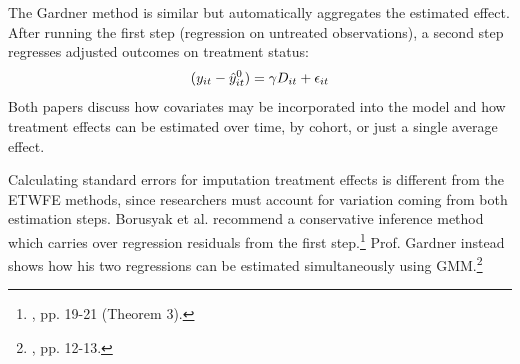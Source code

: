 \documentclass[12pt]{article}
\begin{document}
The Gardner method is similar but automatically aggregates the estimated effect. After running the first step (regression on untreated observations), a second step regresses adjusted outcomes on treatment status:
\begin{equation}
(y_{it} - \Hat{y}_{it}^0) = \gamma D_{it} + \epsilon_{it}    
\end{equation}
Both papers discuss how covariates may be incorporated into the model and how treatment effects can be estimated over time, by cohort, or just a single average effect.

Calculating standard errors for imputation treatment effects is different from the ETWFE methods, since researchers must account for variation coming from both estimation steps. Borusyak et al. recommend a conservative inference method which carries over regression residuals from the first step.\footnote{\citet{borusyak2024revisiting}, pp. 19-21 (Theorem 3).}  Prof. Gardner instead shows how his two regressions can be estimated simultaneously using GMM.\footnote{\citet{gardner2022a}, pp. 12-13.}
\end{document}
